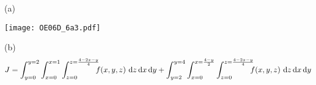 %

\begin{answer}
(a)

\begin{center}
     \texttt{[image: OE06D\_6a3.pdf]}
\end{center}

(b)
\begin{align*}
J = \int_{y=0}^{y=2} \int_{x=0}^{x=1} \int_{z=0}^{z=\frac{4-2x-y}{4}}
        \!\!\!\! f(x,y,z)  \ \dee{z}\,\dee{x}\,\dee{y}
+\int_{y=2}^{y=4} \int_{x=0}^{x=\frac{4-y}{2}} \int_{z=0}^{z=\frac{4-2x-y}{4}} 
        \!\!\!\!  f(x,y,z)\ \dee{z}\,\dee{x}\,\dee{y}
\end{align*}

\end{answer}

